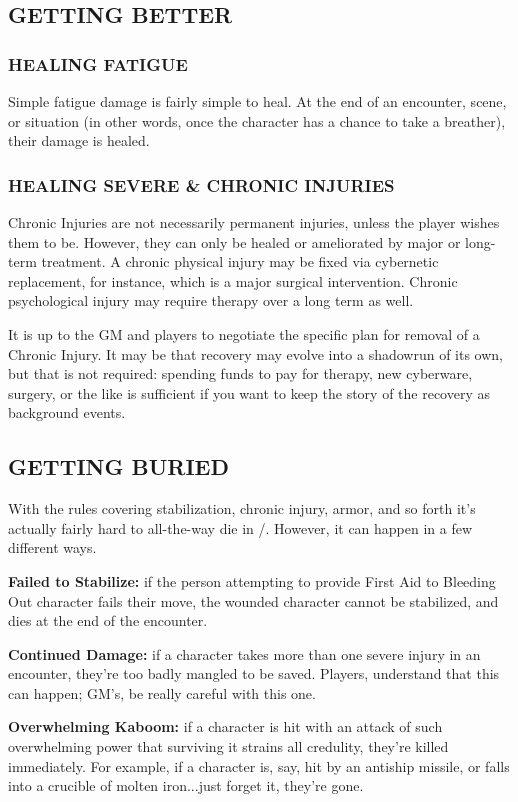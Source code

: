 \documentclass[oneside,10pt]{article}
\begin{document}
\begin{multicols}{2}
\subsection{GETTING BETTER}
\subsubsection{HEALING FATIGUE}
Simple fatigue damage is fairly simple to heal. At the end of an encounter,
scene, or situation (in other words, once the character has a chance
to take a breather), their damage is healed.

\subsubsection{HEALING SEVERE \& CHRONIC INJURIES}
Chronic Injuries are not necessarily permanent injuries, unless the
player wishes them to be. However, they can only be healed or
ameliorated by major or long-term treatment. A chronic physical injury
may be fixed via cybernetic replacement, for instance, which is a
major surgical intervention.  Chronic psychological injury may require
therapy over a long term as well.

It is up to the GM and players to negotiate the specific plan
for removal of a Chronic Injury. It may be that recovery may
evolve into a shadowrun of its own, but that is not required:
spending funds to pay for therapy, new cyberware, surgery,
or the like is sufficient if you want to keep the story of the
recovery as background events.

\subsection{GETTING BURIED}
With the rules covering stabilization, chronic injury, armor, and so
forth it’s actually fairly hard to all-the-way die in \SW/. However,
it can happen in a few different ways.
\begin{dent}

\textbf{Failed to Stabilize:} if the person attempting to provide
First Aid to Bleeding Out character fails their move, the
wounded character cannot be stabilized, and dies at the
end of the encounter.

\textbf{Continued Damage:} if a character takes more than one severe
injury in an encounter, they’re too badly mangled to be
saved. Players, understand that this can happen; GM’s, be really
careful with this one.

\textbf{Overwhelming Kaboom:} if a character is hit with an attack of
such overwhelming power that surviving it strains all credulity,
they’re killed immediately. For example, if a character is, say, hit
by an antiship missile, or falls into a crucible of molten iron...just
forget it, they’re gone.

\end{dent}

\end{multicols}
\end{document}
